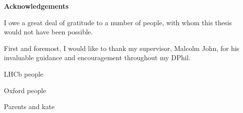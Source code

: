 %
%
%


\begin{alwayssingle} 
    \thispagestyle{empty}
    \begin{center}
        \vspace*{1.5cm}
        {\Large \bfseries Acknowledgements}
    \end{center}
    \vspace{0.5cm}
    I owe a great deal of gratitude to a number of people, with whom this thesis would not have been possible.

    First and foremost, I would like to thank my supervisor, Malcolm John, for his invaluable guidance and encouragement throughout my DPhil.  

    LHCb people

    Oxford people 

    Parents and kate

\end{alwayssingle}
